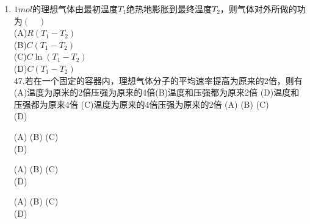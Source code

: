 \begin{enumerate}
(A)内能必相等\\
(B)分子的平均动能相同\\
(C)分子的平均平动能相同\\
(D)分子的平均速率相同
\item $1mol$的理想气体由最初温度$T_1$绝热地影胀到最终温度$T_2$，则气体对外所做的功为$(\quad)$\\
(A)$R(T_1-T_2)$\\
(B)$C(T_1-T_2)$\\
(C)$C\ln (T_1-T_2)$\\
(D)$C(T_1-T_2)$\\
47.若在一个固定的容器内，理想气体分子的平均速率提高为原来的2倍，则有
(A)温度为原米的2倍压强为原来的4倍(B)温度和压强都为原来2倍
(D)温度和压强都为原来4倍
(C)温度为原来的4倍压强为原来的2倍
(A)
(B)
(C)\\
(D)


(A)
(B)
(C)\\
(D)


(A)
(B)
(C)\\
(D)


(A)
(B)
(C)\\
(D)
\end{enumerate}
